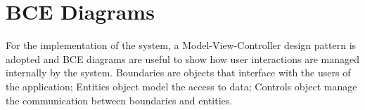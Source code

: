 \begin{center}
\end{center}
%
%
%
%
\section{BCE Diagrams}
For the implementation of the system, a Model-View-Controller design pattern is adopted and BCE diagrams are useful to show how user interactions are managed internally by the system. Boundaries are objects that interface with the users of the application; Entities object model the access to data; Controls object manage the communication between boundaries and entities.


